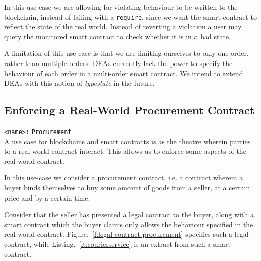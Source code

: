 \documentclass{article}
\begin{document}
  
  In this use case we are allowing for violating behaviour to be written to the blockchain, instead of failing with a \texttt{require}, since we want the smart contract to reflect the state of the real world. Instead of reverting a violation a user may query the monitored smart contract to check whether it is in a bad state. 
  
  A limitation of this use case is that we are limiting ourselves to only one order, rather than multiple orders. DEAs currently lack the power to specify the behaviour of each order in a multi-order smart contract. We intend to extend DEAs with this notion of \emph{typestate} in the future.
  
  
   \subsection{Enforcing a Real-World Procurement Contract}
   
       \texttt{<name>:} \verb+Procurement+\\
   
   A use case for blockchains and smart contracts is as the theatre wherein parties to a real-world contract interact. This allows us to enforce some aspects of the real-world contract.
   
   In this use-case we consider a procurement contract, i.e. a contract wherein a buyer binds themselves to buy some amount of goods from a seller, at a certain price and by a certain time. 
   
   Consider that the seller has presented a legal contract to the buyer, along with a smart contract which the buyer claims only allows the behaviour specified in the real-world contract. Figure.~\ref{f:legal-contract-procurement} specifies such a legal contract, while Listing.~\ref{lt:courierservice} is an extract from such a smart contract.
   
\end{document}
